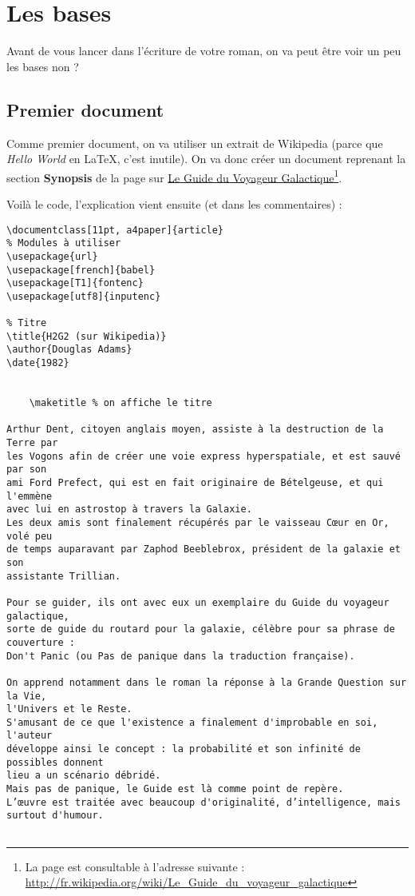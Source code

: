 \section{Les bases} %
\label{sec:Les bases}

Avant de vous lancer dans l'écriture de votre roman, on va peut être voir un peu les bases non ?

\subsection{Premier document} %
\label{sub:Premier document}

Comme premier document, on va utiliser un extrait de Wikipedia (parce que {\itshape Hello World} en \LaTeX, c'est inutile).
On va donc créer un document reprenant la section {\bfseries Synopsis} de la page sur \underline{Le Guide du Voyageur Galactique}\footnote{La page est consultable à l'adresse suivante : \url{http://fr.wikipedia.org/wiki/Le_Guide_du_voyageur_galactique}}.

Voilà le code, l'explication vient ensuite (et dans les commentaires) :

\begin{verbatim}
\documentclass[11pt, a4paper]{article}
% Modules à utiliser
\usepackage{url}
\usepackage[french]{babel}
\usepackage[T1]{fontenc}
\usepackage[utf8]{inputenc}

% Titre
\title{H2G2 (sur Wikipedia)}
\author{Douglas Adams}
\date{1982}


    \maketitle % on affiche le titre

Arthur Dent, citoyen anglais moyen, assiste à la destruction de la Terre par
les Vogons afin de créer une voie express hyperspatiale, et est sauvé par son
ami Ford Prefect, qui est en fait originaire de Bételgeuse, et qui l'emmène
avec lui en astrostop à travers la Galaxie.
Les deux amis sont finalement récupérés par le vaisseau Cœur en Or, volé peu
de temps auparavant par Zaphod Beeblebrox, président de la galaxie et son
assistante Trillian.

Pour se guider, ils ont avec eux un exemplaire du Guide du voyageur galactique,
sorte de guide du routard pour la galaxie, célèbre pour sa phrase de couverture :
Don't Panic (ou Pas de panique dans la traduction française).

On apprend notamment dans le roman la réponse à la Grande Question sur la Vie,
l'Univers et le Reste.
S'amusant de ce que l'existence a finalement d'improbable en soi, l'auteur
développe ainsi le concept : la probabilité et son infinité de possibles donnent
lieu a un scénario débridé.
Mais pas de panique, le Guide est là comme point de repère.
L’œuvre est traitée avec beaucoup d'originalité, d’intelligence, mais surtout d'humour.


\end{verbatim}

